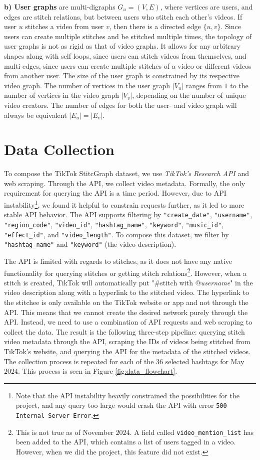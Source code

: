 \textbf{b) User graphs} are multi-digraphs $G_u=(V,E)$, where vertices are users, and edges are stitch relations, but between users who stitch each other's videos. If user $u$ stitches a video from user $v$, then there is a directed edge $\{u,v\}$. Since users can create multiple stitches and be stitched multiple times, the topology of user graphs is not as rigid as that of video graphs. It allows for any arbitrary shapes along with self loops, since users can stitch videos from themselves, and multi-edges, since users can create multiple stitches of a video or different videos from another user. The size of the user graph is constrained by its respective video graph. The number of vertices in the user graph $|V_u|$ ranges from $1$ to the number of vertices in the video graph $|V_v|$, depending on the number of unique video creators. The number of edges for both the user- and video graph will always be equivalent $|E_u| = |E_v|$. 




\section{Data Collection}
To compose the TikTok StitcGraph dataset, we use \textit{TikTok's Research API} \citep{tiktokresearchapi} and web scraping. Through the API, we collect video metadata. Formally, the only requirement for querying the API is a time period. However, due to API instability\footnote{Note that the API instability heavily constrained the possibilities for the project, and any query too large would crash the API with error \texttt{500 Internal Server Error}.}, we found it helpful to constrain requests further, as it led to more stable API behavior. The API supports filtering by \texttt{"create\_date"}, \texttt{"username"}, \texttt{"region\_code"}, \texttt{"video\_id"}, \texttt{"hashtag\_name"}, \texttt{"keyword"}, \texttt{"music\_id"}, \texttt{"effect\_id"}, and \texttt{"video\_length"}. To compose this dataset, we filter by \texttt{"hashtag\_name"} and \texttt{"keyword"} (the video description).

The API is limited with regards to stitches, as it does not have any native functionality for querying stitches or getting stitch relations\footnote{This is not true as of November $2024$. A field called \texttt{video\_mention\_list} has been added to the API, which contains a list of users tagged in a video. However, when we did the project, this feature did not exist.}. However, when a stitch is created, TikTok will automatically put "\#stitch with @\textit{username}" in the video description along with a hyperlink to the stitched video. The hyperlink to the stitchee is only available on the TikTok website or app and not through the API. This means that we cannot create the desired network purely through the API. Instead, we need to use a combination of API requests and web scraping to collect the data. The result is the following three-step pipeline: querying stitch video metadata through the API, scraping the IDs of videos being stitched from TikTok's website, and querying the API for the metadata of the stitched videos. The collection process is repeated for each of the $36$ selected hashtags for May $2024$. This process is seen in Figure \ref{fig:data_flowchart}.


